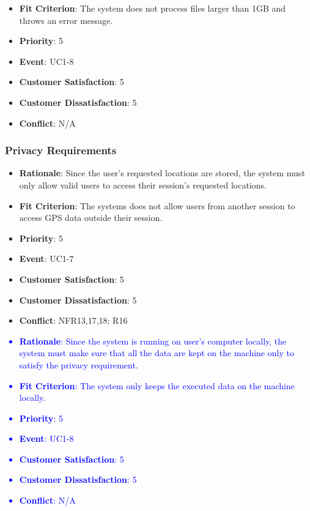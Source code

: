 \documentclass[12pt, titlepage]{article}
\newcounter{reqnum} %
\newcounter{freqnum} %
\begin{document}
\begin{itemize}
{\begin{itemize}
safe saving and uploading of files.
    \item \textbf{Fit Criterion}: The system does not process files larger than 1GB and throws an error message. 
    \item \textbf{Priority}: 5
    \item \textbf{Event}: UC1-8%
    \item \textbf{Customer Satisfaction}: 5
    \item \textbf{Customer Dissatisfaction}: 5
    \item \textbf{Conflict}: N/A
\end{itemize}
}

\subsubsection{Privacy Requirements}
\item[NFR\refstepcounter{freqnum}\thefreqnum
\label{NFR}:] 
\begin{itemize}
    \item \textbf{Rationale}: Since the user's requested locations are stored, the system must only allow valid users to access their session's requested locations.
    \item \textbf{Fit Criterion}: The systems does not allow users from another session to access GPS data outside their session.
    \item \textbf{Priority}: 5
    \item \textbf{Event}: UC1-7%
    \item \textbf{Customer Satisfaction}: 5
    \item \textbf{Customer Dissatisfaction}: 5
    \item \textbf{Conflict}: NFR13,17,18; R16
\end{itemize}

\textcolor{blue}{
\item[NFR\refstepcounter{freqnum}\thefreqnum
\label{NFR}:] 
\begin{itemize}
    \item \textbf{Rationale}: Since the system is running on user's computer locally, the system must make sure that all the data are kept on the machine only to satisfy the privacy requirement.
    \item \textbf{Fit Criterion}: The system only keeps the executed data on the machine locally.
    \item \textbf{Priority}: 5
    \item \textbf{Event}: UC1-8%
    \item \textbf{Customer Satisfaction}: 5
    \item \textbf{Customer Dissatisfaction}: 5
    \item \textbf{Conflict}: N/A
\end{itemize}
}


\end{itemize}
\end{document}
